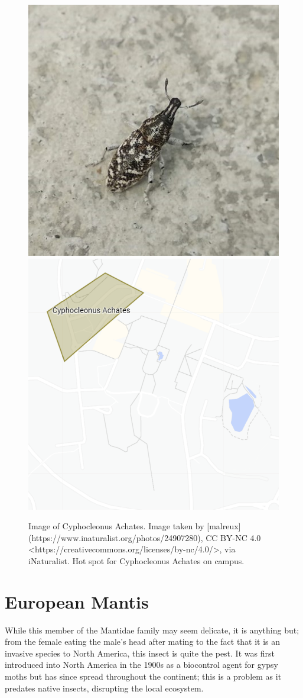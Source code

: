 \documentclass[
]{book}
\begin{document}
\begin{figure}

{\centering \includegraphics[width=0.49\linewidth,height=0.2\textheight]{insect_images/cyphocleonus_11} \includegraphics[width=0.49\linewidth,height=0.2\textheight]{insect_images/cyphocleonus_hotspot_11} 

}

\caption{Image of Cyphocleonus Achates. Image taken by [malreux](https://www.inaturalist.org/photos/24907280), CC BY-NC 4.0 <https://creativecommons.org/licenses/by-nc/4.0/>, via iNaturalist. Hot spot for Cyphocleonus Achates on campus.}\label{fig:unnamed-chunk-1}
\end{figure}

\hypertarget{european-mantis}{%
\section{European Mantis}\label{european-mantis}}

While this member of the Mantidae family may seem delicate, it is anything but; from the female eating the male's head after mating to the fact that it is an invasive species to North America, this insect is quite the pest. It was first introduced into North America in the 1900s as a biocontrol agent for gypsy moths but has since spread throughout the continent; this is a problem as it predates native insects, disrupting the local ecosystem.
\end{document}
